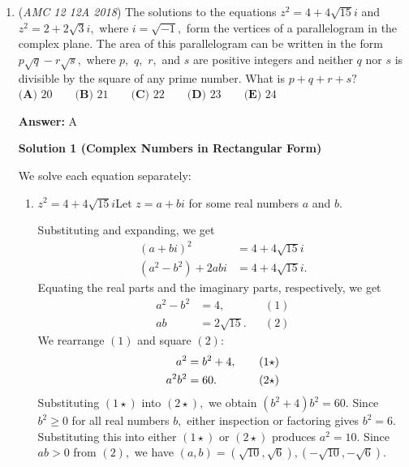 \begin{enumerate}
 



\textbf{Solution 10 (very fast)}

Obviously, eliminate $(E).$ Note that for answer choices $(A)$ and $(B),$ $x \approx \sqrt[11]{\left(-\frac{1}{2018}\right)} > \sqrt[13]{\left(-\frac{1}{2018}\right)},$ with the RHS being approximately the value for $x$ when considering answer choices $(C)$ or $(D),$ so the answer is either $(A)$ or $(B).$ Now, since $x^{19} < x^{17}$ for all negative reals $x < -1$ (we want to choose the option closer to $0$ because then we will have to decrease $x$ less since we estimated), we have $\boxed{(B)}$ as the clear answer. 

 \href{https://artofproblemsolving.com/videos/amc/2018amc12a/471}{https://artofproblemsolving.com/videos/amc/2018amc12a/471}

 


	\item (\textit{AMC 12 12A 2018}) The solutions to the equations $z^2=4+4\sqrt{15}i$ and $z^2=2+2\sqrt 3i,$ where $i=\sqrt{-1},$ form the vertices of a parallelogram in the complex plane. The area of this parallelogram can be written in the form $p\sqrt q-r\sqrt s,$ where $p,$ $q,$ $r,$ and $s$ are positive integers and neither $q$ nor $s$ is divisible by the square of any prime number. What is $p+q+r+s?$
$\textbf{(A) } 20 \qquad  \textbf{(B) } 21 \qquad  \textbf{(C) } 22 \qquad  \textbf{(D) } 23 \qquad  \textbf{(E) } 24$

 \textbf{Answer: }A



\textbf{Solution 1 (Complex Numbers in Rectangular Form)}

We solve each equation separately:

 
            \begin{enumerate} 
        \item $z^2=4+4\sqrt{15}i$Let $z=a+bi$ for some real numbers $a$ and $b.$ 

 Substituting and expanding, we get 
 \begin{align*} (a+bi)^2&=4+4\sqrt{15}i \\ \left(a^2-b^2\right)+2abi&=4+4\sqrt{15}i. \end{align*}
Equating the real parts and the imaginary parts, respectively, we get
 \begin{align*} a^2-b^2&=4, &&(1) \\ ab&=2\sqrt{15}. &&(2) \end{align*}
We rearrange $(1)$ and square $(2):$
 \begin{align*} a^2&=b^2+4, \hspace{4mm} &&(1\star) \\ a^2b^2&=60. &&(2\star) \end{align*}
Substituting $(1\star)$ into $(2\star),$ we obtain $\left(b^2+4\right)b^2=60.$ Since $b^2\geq0$ for all real numbers $b,$ either inspection or factoring gives $b^2=6.$ Substituting this into either $(1\star)$ or $(2\star)$ produces $a^2=10.$ Since $ab>0$ from $(2),$ we have $(a,b)=\left(\sqrt{10},\sqrt{6}\right),\left(-\sqrt{10},-\sqrt{6}\right).$ 


\end{enumerate}
\end{enumerate}
